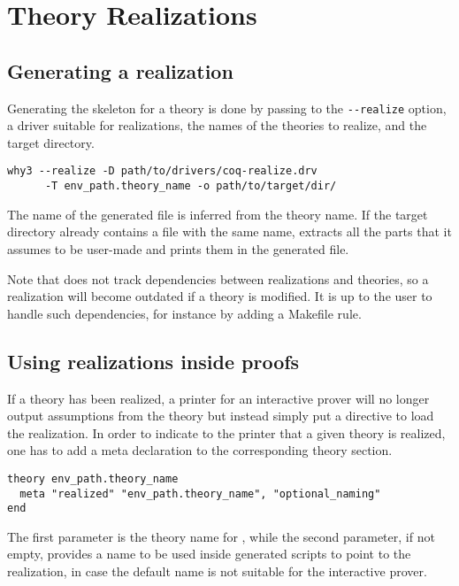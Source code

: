 \chapter{Theory Realizations}
\label{chap:realizations}

\section{Generating a realization}

Generating the skeleton for a theory is done by passing to \why the
\verb+--realize+ option, a driver suitable for realizations, the names of
the theories to realize, and the target directory.

\begin{verbatim}
why3 --realize -D path/to/drivers/coq-realize.drv
      -T env_path.theory_name -o path/to/target/dir/
\end{verbatim}

The name of the generated file is inferred from the theory name. If the
target directory already contains a file with the same name, \why
extracts all the parts that it assumes to be user-made and prints them in
the generated file.

Note that \why does not track dependencies between realizations and
theories, so a realization will become outdated if a theory is modified.
It is up to the user to handle such dependencies, for instance by adding
a Makefile rule.

\section{Using realizations inside proofs}

If a theory has been realized, a \why printer for an interactive prover
will no longer output assumptions from the theory but instead simply put
a directive to load the realization. In order to indicate to the printer
that a given theory is realized, one has to add a meta declaration to the
corresponding theory section.

\begin{verbatim}
theory env_path.theory_name
  meta "realized" "env_path.theory_name", "optional_naming"
end
\end{verbatim}

The first parameter is the theory name for \why, while the second
parameter, if not empty, provides a name to be used inside generated
scripts to point to the realization, in case the default name is not
suitable for the interactive prover.

